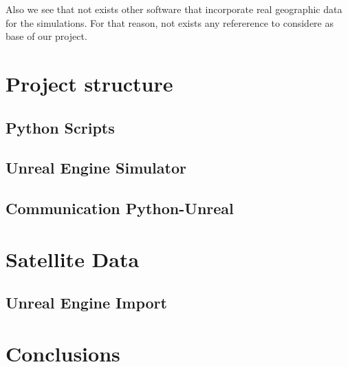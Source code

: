 \documentclass[10pt,a4paper]{article}
\begin{document}
	Also we see that not exists other software that incorporate real geographic data for the simulations. For that reason, not exists any refererence to considere as base of our project.

	\section{Project structure}

	\subsection{Python Scripts}
	\subsection{Unreal Engine Simulator}
	\subsection{Communication Python-Unreal}

	\section{Satellite Data}
	\subsection{Unreal Engine Import}

	\section{Conclusions}
		
\newpage


	
\end{document}
